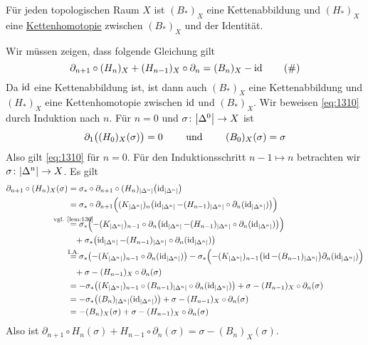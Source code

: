 \begin{lemma}[{name=[{Kettenhomotopie zwischen $(H_*)_X$ und der Identität}]},label=lem:138]
	Für jeden topologischen Raum $X$ ist $(B_*)_X$ eine Kettenabbildung und $(H_*)_X$ eine \hyperref[def:76]{Kettenhomotopie} zwischen $(B_*)_X$ und der Identität.
\end{lemma}
\begin{beweis}
	Wir müssen zeigen, dass folgende Gleichung gilt
	\begin{equation}
		\partial_{n+1} \circ (H_n)_X + (H_{n-1})_X \circ \partial_n = (B_n)_X - \id \tag{\#} \label{eq:1310}
	\end{equation}
	Da $\id$ eine Kettenabbildung ist, ist dann auch $(B_*)_X$ eine Kettenabbildung und $(H_*)_X$ eine Kettenhomotopie zwischen $\id$ und $(B_*)_X$. Wir beweisen \eqref{eq:1310}
	durch Induktion nach $n$. Für $n=0$ und $\sigma \colon \abs*{\Delta^0} \to X$ ist
	\[
		\partial_1 \enbrace[\big]{ (H_0)_X (\sigma)} = 0 \qquad \text{ und } \qquad  (B_0)_X(\sigma) = \sigma 
	\]
	Also gilt \eqref{eq:1310} für $n=0$. Für den Induktionsschritt $n-1 \mapsto n$ betrachten wir $\sigma \colon \abs*{\Delta^n} \to X$. Es gilt
	\begin{align*}
		\partial_{n+1} \circ (H_n)_X (\sigma) &= \sigma_* \circ \partial_{n+1} \circ (H_n)_{\abs*{\Delta^n}} \enbrace*{\id_{\abs*{\Delta^n}}} \\
		&= \sigma_* \circ \partial_{n+1} \enbrace[\Big]{(K_{\abs*{\Delta^n} })_n \enbrace*{ \id_{\abs*{\Delta^n}}- (H_{n-1})_{\abs*{\Delta^n}} \circ \partial_n 
		\enbrace{\id_{\abs*{\Delta^n}}}}} \\
		&\StackTextClap{vgl. \ref{lem:136}}{=} \sigma_* \enbrace[\Big]{- (K_{\abs*{\Delta^n}})_{n-1} \circ \partial_n \enbrace*{\id_{\abs{\Delta^n}} 
		- (H_{n-1})_{\abs*{\Delta^n}} \circ \partial_n (\id_{\abs*{\Delta^n} }) } } \\
		&\phantom{ = } + \sigma_* \enbrace*{\id_{\abs*{\Delta^n}} - (H_{n-1})_{\abs*{\Delta^n}} \circ \partial_n (\id_{\abs*{\Delta^n}})} \\
		&\stackrel{\mathclap{\text{I.A.}}}{=} \sigma_*  \enbrace*{- (K_{\abs*{\Delta^n}})_{n-1} \circ \partial_n (\id_{\abs*{\Delta^n}})}  
		- \sigma_* \enbrace[\Big]{- (K_{\abs*{\Delta^n}})_{n-1}  \enbrace*{\id - (B_{n-1})_{\abs*{\Delta^n}}}  \partial_n (\id_{\abs*{\Delta^n} }) } \\
		&\phantom{ = } + \sigma- (H_{n-1})_X \circ \partial_n(\sigma) \\
		&= - \sigma_* \enbrace*{(K_{\abs*{\Delta^n}})_{n-1} \circ (B_{n-1})_{\abs*{\Delta^n}} \circ \partial_n(\id_{\abs*{\Delta^n}})}
		+ \sigma - (H_{n-1})_X \circ \partial_n(\sigma) \\
		&= - \sigma_* \enbrace[\big]{(B_n)_{\abs*{\Delta^n}} \enbrace{\id_{\abs*{\Delta^n}}}} + \sigma - (H_{n-1})_X \circ \partial_n (\sigma) \\
		&= -(B_n)_X(\sigma) + \sigma - (H_{n-1})_X \circ \partial_n(\sigma)
	\end{align*}
	Also ist $\partial_{n+1} \circ H_n(\sigma) + H_{n-1} \circ \partial_{n}(\sigma) = \sigma - (B_n)_X(\sigma)$.
\end{beweis}

